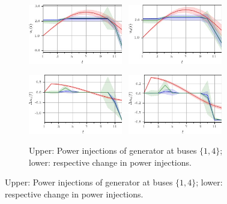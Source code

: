 \documentclass[final,3p,times,twocolumn]{elsarticle}  %
\begin{document}
\begin{figure}
\begin{subfigure}[c]{\figwidth}
        \includegraphics[width=0.45\textwidth]{figures/time series/case5_artificial/gen_u_8101.jpg}~
        \includegraphics[width=0.45\textwidth]{figures/time series/case5_artificial/gen_u_8102.jpg}%
		
        \includegraphics[width=0.45\textwidth]{figures/time series/case5_artificial/gen_delta_u_8151.jpg}~
        \includegraphics[width=0.45\textwidth]{figures/time series/case5_artificial/gen_delta_u_8152.jpg}%
        
		\vspace{-2mm}		
		\caption{Upper: Power injections of generator at buses $\{1, 4\}$; lower: respective change in power injections.}
		\label{fig:case5:Generation}
	\end{subfigure}
	

\end{figure}
\end{document}
